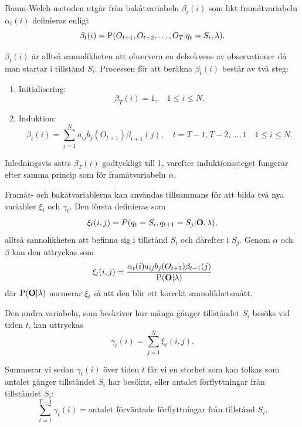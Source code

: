 \documentclass[../rapport_MVEX01-11-05]{subfiles}
\begin{document}
Baum-Welch-metoden utgår från bakåtvariabeln $\beta_t(i)$ som likt
framåtvariabeln $\alpha_t(i)$ definieras enligt
\begin{equation*}
\beta_t(i) = \mathrm{P}(O_{t+1},O_{t+2},\dots,O_T | q_t = S_i, \lambda).
\end{equation*} 

$\beta_t(i)$ är alltså sannolikheten att observera en delsekvens av
observationer då man startar i tillstånd $S_i$. Processen för att beräkna $\beta_t(i)$ består av två steg:
\begin{enumerate}
\item Initialisering: 
\begin{equation*}
\beta_T(i) = 1, \quad 1 \leq i \leq N.
\end{equation*}
\item Induktion: 
\begin{equation*}
\beta_t(i) = \sum\limits_{j=1}^Na_{ij}b_j(O_{t+1})\beta_{t+1}(j), \quad t =
T-1,T-2,\dots,1 \quad 1 \leq i \leq N.
\end{equation*}
\end{enumerate}

Inledningsvis sätts $\beta_T(i)$ godtyckligt till 1, varefter
induktionssteget fungerar efter samma princip som för framåtvariabeln
$\alpha$.

Framåt- och bakåtvariablerna kan användas tillsammans
för att bilda två nya variabler $\xi_t$ och $\gamma_t$.
Den första definieras som 
\begin{equation*}
\xi_t(i,j) = P(q_t = S_i, q_{t+1} = S_j|\mathbf{O},\lambda),
\end{equation*}
alltså sannolikheten att befinna sig i tillstånd $S_i$ och
därefter i $S_j$. Genom $\alpha$ och $\beta$ kan den uttryckas som
\begin{equation*}
\xi_t(i,j) = \frac{\alpha_t(i)a_{ij}b_j(O_{t+1})\beta_{t+1}(j)}{\mathrm{P}(\mathbf{O}|\lambda)}
\end{equation*} 
där $\mathrm{P}(\mathbf{O}|\lambda)$ normerar $\xi_t$ så att den blir ett korrekt
sannolikhetsmått.

Den andra variabeln, som beskriver hur många gånger tillståndet $S_i$ besöks
vid tiden $t$, kan uttryckas
\begin{equation*}
\gamma_t(i) = \sum_{j=1}^N\xi_t(i,j).
\end{equation*}

Summerar vi sedan $\gamma_t(i)$ över tiden $t$ får vi en storhet
som kan tolkas som antalet gånger tillståndet $S_i$ har besökts,
eller antalet förflyttningar från tillståndet $S_i$:
\begin{equation*}
\sum_{t=1}^{T-1}\gamma_t(i) = \text{antalet förväntade förflyttningar
  från tillstånd $S_i$.}
\end{equation*} 
\end{document}
